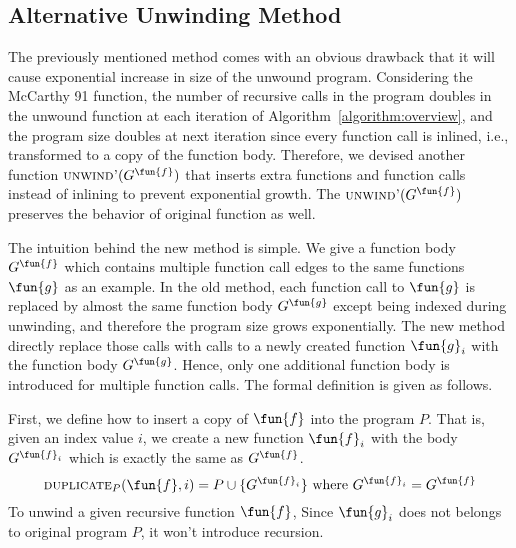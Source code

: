 \subsection{Alternative Unwinding Method}\label{subsec:new-unwinding}
The previously mentioned method comes with an obvious drawback that it will
cause exponential increase in size of the unwound program.
Considering the McCarthy 91 function, the number of recursive calls in the
program doubles in the unwound function at each iteration of
Algorithm~\ref{algorithm:overview},
and the program size doubles at next iteration since every function call is
inlined, i.e., transformed to a copy of the function body.
Therefore, we devised another function $\textsc{unwind'}(G^\fun{f})$ that
inserts extra functions and function calls instead of inlining to prevent
exponential growth. The $\textsc{unwind'}(G^\fun{f})$ preserves the behavior
of original function as well.

The intuition behind the new method is simple.
We give a function body $G^\fun{f}$ which contains multiple function call edges
to the same functions $\fun{g}$ as an example.
In the old method, each function call to $\fun{g}$ is replaced by almost the
same function body $G^\fun{g}$ except being indexed during unwinding,
and therefore the program size grows exponentially.
The new method directly replace those calls with calls to a newly created
function $\fun{g}_i$ with the function body $G^\fun{g}$.
Hence, only one additional function body is introduced for multiple function
calls. The formal definition is given as follows.

First, we define how to insert a copy of $\fun{f}$ into the program $P$.
That is, given an index value $i$, we create a new function $\fun{f}_i$ with
the body $G^{\fun{f}_i}$ which is exactly the same as $G^\fun{f}$.
\begin{equation*}
  \textsc{duplicate}_P(\fun{f}, i) = P\cup\{G^{\fun{f}_i}\} \text{ where }
  G^{\fun{f}_i} = G^\fun{f}
\end{equation*}
To unwind a given recursive function $\fun{f}$,
Since $\fun{g}_i$ does not belongs to original program $P$, it won't introduce
recursion.

